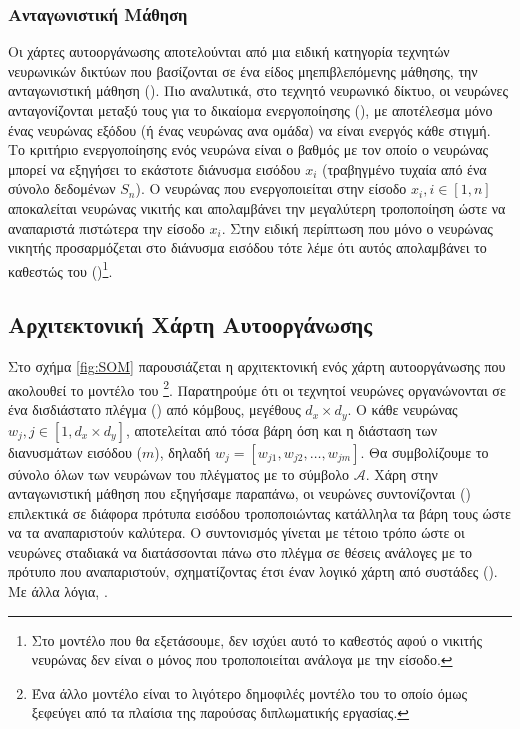 \subsubsection{Ανταγωνιστική Μάθηση}

Οι χάρτες αυτο\textendash οργάνωσης αποτελούνται από μια ειδική κατηγορία τεχνητών νευρωνικών δικτύων που βασίζονται σε ένα είδος μη\textendash επιβλεπόμενης μάθησης, την ανταγωνιστική μάθηση ()\cite{haykin2009neural}. Πιο αναλυτικά, στο τεχνητό νευρωνικό δίκτυο, οι νευρώνες ανταγονίζονται μεταξύ τους για το δικαίομα ενεργοποίησης (), με αποτέλεσμα μόνο ένας νευρώνας εξόδου (ή ένας νευρώνας ανα ομάδα) να είναι ενεργός κάθε στιγμή. Το κριτήριο ενεργοποίησης ενός νευρώνα είναι ο βαθμός με τον οποίο ο νευρώνας μπορεί να εξηγήσει το εκάστοτε διάνυσμα εισόδου $x_i$ (τραβηγμένο τυχαία από ένα σύνολο δεδομένων $S_n$). Ο νευρώνας που ενεργοποιείται στην είσοδο $x_i, i \in [1,n]$ αποκαλείται νευρώνας νικιτής και απολαμβάνει την μεγαλύτερη τροποποίηση ώστε να αναπαριστά πιστώτερα την είσοδο $x_i$. Στην ειδική περίπτωση που μόνο ο νευρώνας νικητής προσαρμόζεται στο διάνυσμα εισόδου τότε λέμε ότι αυτός απολαμβάνει το καθεστώς του  ()\footnote{Στο μοντέλο που θα εξετάσουμε, δεν ισχύει αυτό το καθεστός αφού ο νικιτής νευρώνας δεν είναι ο μόνος που τροποποιείται ανάλογα με την είσοδο.}. \par

\subsection{Αρχιτεκτονική Χάρτη Αυτο\textendash οργάνωσης}

Στο σχήμα \ref{fig:SOM} παρουσιάζεται η αρχιτεκτονική ενός χάρτη αυτο\textendash οργάνωσης που ακολουθεί το μοντέλο του \footnote{Ένα άλλο μοντέλο είναι το λιγότερο δημοφιλές μοντέλο του  το οποίο όμως ξεφεύγει από τα πλαίσια της παρούσας διπλωματικής εργασίας.}. Παρατηρούμε ότι οι τεχνητοί νευρώνες οργανώνονται σε ένα δισδιάστατο πλέγμα () από κόμβους, μεγέθους $d_x \times d_y$. Ο κάθε νευρώνας $w_j, j \in [1, d_x \times d_y]$, αποτελείται από τόσα βάρη όση και η διάσταση των διανυσμάτων εισόδου ($m$), δηλαδή $w_j = [w_{j1}, w_{j2}, \dots, w_{jm}]$. Θα συμβολίζουμε το σύνολο όλων των νευρώνων του πλέγματος με το σύμβολο $\mathcal{A}$. Χάρη στην ανταγωνιστική μάθηση που εξηγήσαμε παραπάνω, οι νευρώνες συντονίζονται () επιλεκτικά σε διάφορα πρότυπα εισόδου τροποποιώντας κατάλληλα τα βάρη τους ώστε να τα αναπαριστούν καλύτερα. Ο συντονισμός γίνεται με τέτοιο τρόπο ώστε οι νευρώνες σταδιακά να διατάσσονται πάνω στο πλέγμα σε θέσεις ανάλογες με το πρότυπο που αναπαριστούν, σχηματίζοντας έτσι έναν λογικό χάρτη από συστάδες (). Με άλλα λόγια, \cite{haykin2009neural}. \par

